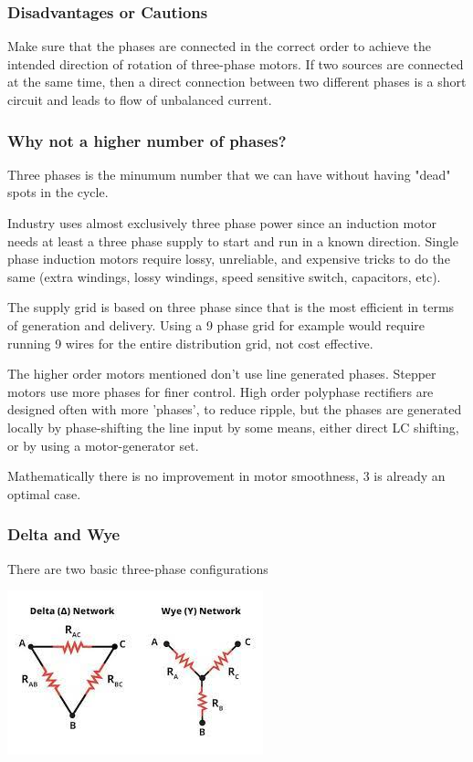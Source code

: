 \subsubsection{Disadvantages or Cautions}
Make sure that the phases are connected in the correct order to achieve the intended direction of rotation of three-phase motors. If two sources are connected at the same time, then a direct connection between two different phases is a short circuit and leads to flow of unbalanced current.

\subsubsection{Why not a higher number of phases?}
Three phases is the minumum number that we can have without having "dead" spots in the cycle.

Industry uses almost exclusively three phase power since an induction motor needs at least a three phase supply to start and run in a known direction. Single phase induction motors require lossy, unreliable, and expensive tricks to do the same (extra windings, lossy windings, speed sensitive switch, capacitors, etc).

The supply grid is based on three phase since that is the most efficient in terms of generation and delivery. Using a 9 phase grid for example would require running 9 wires for the entire distribution grid, not cost effective.

The higher order motors mentioned don't use line generated phases. Stepper motors use more phases for finer control. High order polyphase rectifiers are designed often with more 'phases', to reduce ripple, but the phases are generated locally by phase-shifting the line input by some means, either direct LC shifting, or by using a motor-generator set.

Mathematically there is no improvement in motor smoothness, 3 is already an optimal case.

\subsubsection{Delta and Wye}
There are two basic three-phase configurations
\begin{define}
    \begin{center}
        \includegraphics[scale=0.8]{figs/delta_wye.jpeg}
    \end{center}
\end{define}


